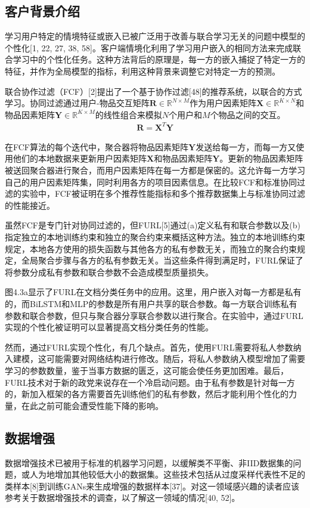 \subsection{客户背景介绍}
学习用户特定的情境特征或嵌入已被广泛用于改善与联合学习无关的问题中模型的个性化[1, 22, 27, 38, 58]。客户端情境化利用了学习用户嵌入的相同方法来完成联合学习中的个性化任务。这种方法背后的原理是，每一方的嵌入捕捉了特定一方的特征，并作为全局模型的指标，利用这种背景来调整它对特定一方的预测。

联合协作过滤（FCF）[2]提出了一个基于协作过滤[48]的推荐系统，以联合的方式学习。协同过滤通过用户-物品交互矩阵$\bm{R} \in \mathbb{R}^{N \times M}$作为用户因素矩阵$\bm{X} \in \mathbb{R}^{K \times N}$和物品因素矩阵$\bm{Y} \in \mathbb{R}^{K \times M}$的线性组合来模拟$N$个用户和$M$个物品之间的交互。
\begin{align}\label{eq:4-7}
	\bm{R} = \bm{X}^{T}\bm{Y}
\end{align}

在FCF算法的每个迭代中，聚合器将物品因素矩阵$\bm{Y}$发送给每一方，而每一方又使用他们的本地数据来更新用户因素矩阵$\bm{X}$和物品因素矩阵$\bm{Y}$。更新的物品因素矩阵被送回聚合器进行聚合，而用户因素矩阵在每一方都是保密的。这允许每一方学习自己的用户因素矩阵集，同时利用各方的项目因素信息。在比较FCF和标准协同过滤的实验中，FCF被证明在多个推荐性能指标和多个推荐数据集上与标准协同过滤的性能接近。

虽然FCF是专门针对协同过滤的，但FURL[5]通过(a)定义私有和联合参数以及(b)指定独立的本地训练约束和独立的聚合约束来概括这种方法。独立的本地训练约束规定，本地各方使用的损失函数与其他各方的私有参数无关，而独立的聚合约束规定，全局聚合步骤与各方的私有参数无关。当这些条件得到满足时，FURL保证了将参数分成私有参数和联合参数不会造成模型质量损失。

图4.3a显示了FURL在文档分类任务中的应用。这里，用户嵌入对每一方都是私有的，而BiLSTM和MLP的参数是所有用户共享的联合参数。每一方联合训练私有参数和联合参数，但只与聚合器分享联合参数以进行聚合。在实验中，通过FURL实现的个性化被证明可以显著提高文档分类任务的性能。

然而，通过FURL实现个性化，有几个缺点。首先，使用FURL需要将私人参数纳入建模，这可能需要对网络结构进行修改。随后，将私人参数纳入模型增加了需要学习的参数数量，鉴于当事方数据的匮乏，这可能会使任务更加困难。最后，FURL技术对于新的政党来说存在一个冷启动问题。由于私有参数是针对每一方的，新加入框架的各方需要首先训练他们的私有参数，然后才能利用个性化的力量，在此之前可能会遭受性能下降的影响。

\subsection{数据增强}
数据增强技术已被用于标准的机器学习问题，以缓解类不平衡、非IID数据集的问题，或人为地增加其他较低大小的数据集。这些技术包括从过度采样代表性不足的类样本[8]到训练GANs来生成增强的数据样本[37]。对这一领域感兴趣的读者应该参考关于数据增强技术的调查，以了解这一领域的情况[40, 52]。

